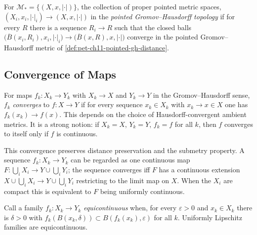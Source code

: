 \begin{definition}
  \label{def:pet-ch11-pointed-gh-topology}
  For $\mathcal{M}_*=\{(X,x,|\cdot|)\}$, the collection of proper pointed
  metric spaces, $(X_i,x_i,|\cdot|_i)\to(X,x,|\cdot|)$ in the \emph{pointed
  Gromov--Hausdorff topology} if for every $R$ there is a sequence $R_i\to R$
  such that the closed balls
  $\big(\overline{B}(x_i,R_i),x_i,|\cdot|_i\big)\to\big(\overline{B}(x,R),x,|\cdot|\big)$
  converge in the pointed Gromov--Hausdorff metric of
  \cref{def:pet-ch11-pointed-gh-distance}.
\end{definition}

\subsection{Convergence of Maps}

\begin{definition}
  \label{def:pet-ch11-convergence-of-maps}
  For maps $f_k:X_k\to Y_k$ with $X_k\to X$ and $Y_k\to Y$ in the
  Gromov--Hausdorff sense,
  $f_k$ \emph{converges} to $f:X\to Y$ if for every sequence $x_k\in X_k$
  with $x_k\to x\in X$ one has $f_k(x_k)\to f(x)$. This depends on the choice
  of Hausdorff-convergent ambient metrics. It is a strong notion: if
  $X_k=X$, $Y_k=Y$, $f_k=f$ for all $k$, then $f$ converges to itself only if
  $f$ is continuous.
\end{definition}

\begin{remark}
  \label{rem:pet-ch11-map-convergence-as-extension}
  This convergence preserves distance preservation and the submetry property. A
  sequence $f_k:X_k\to Y_k$ can be regarded as one continuous map
  $F:\bigcup_iX_i\to Y\cup\bigcup_iY_i$; the sequence converges iff $F$ has a
  continuous extension $X\cup\bigcup_iX_i\to Y\cup\bigcup_iY_i$ restricting to
  the limit map on $X$. When the $X_i$ are compact this is equivalent to $F$
  being uniformly continuous.
\end{remark}

\begin{definition}
  \label{def:pet-ch11-equicontinuous-family}
  Call a family $f_k:X_k\to Y_k$ \emph{equicontinuous} when, for every
  $\varepsilon>0$ and $x_k\in X_k$ there is $\delta>0$ with
  $f_k(B(x_k,\delta))\subset B(f_k(x_k),\varepsilon)$ for all $k$. Uniformly
  Lipschitz families are equicontinuous.
\end{definition}


